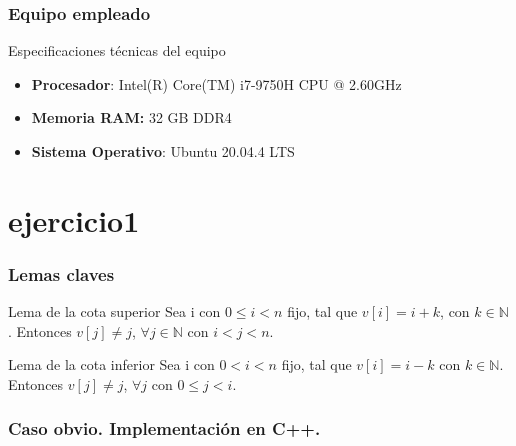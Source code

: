 \documentclass[13pt]{beamer}
\begin{document}
    \begin{frame}
        \frametitle{Equipo empleado}

        \begin{block}{Especificaciones técnicas del equipo}
            \begin{itemize}
                \item \textbf{Procesador}: Intel(R) Core(TM) i7-9750H CPU @ 2.60GHz
                \item \textbf{Memoria RAM:} 32 GB DDR4
                \item \textbf{Sistema Operativo}: Ubuntu 20.04.4 LTS
            \end{itemize}
        \end{block}
    \end{frame}



    \section{ejercicio1}

    \begin{frame}
        \frametitle{Lemas claves}
            \begin{block}{Lema de la cota superior}
                \label{lem:1}
                Sea i con $0 \leqslant i < n$ fijo, tal que $v[i]=i+k$, con $k \in \mathbb N$. 
                Entonces $v[j] \neq j$, $\forall j \in \mathbb N$ con $i < j < n$. 
            \end{block}
            \begin{block}{Lema de la cota inferior}
                \label{lem:2}
                Sea i con $0 < i < n$ fijo, tal que $v[i]=i-k$ con 
                $k \in \mathbb N$. Entonces $v[j] \neq j$,  $\forall j$ con $0 \leqslant j < i$. 
            \end{block}
    \end{frame}


	 \begin{frame}
		\frametitle{Caso obvio. Implementación en C++.}
		 
	\end{frame}
\end{document}
